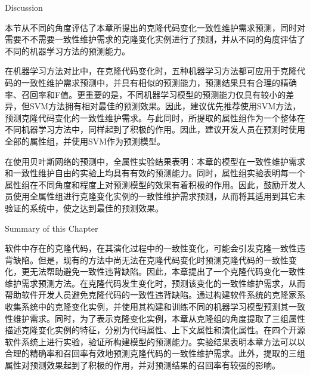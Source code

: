 
{Discussion}

本节从不同的角度评估了本章所提出的克隆代码变化一致性维护需求预测，同时对需要不不需要一致性维护需求的克隆变化实例进行了预测，并从不同的角度评估了不同的机器学习方法的预测能力。

在机器学习方法对比中，在克隆代码变化时，五种机器学习方法都可应用于克隆代码的一致性维护需求预测中，并具有相似的预测能力，预测结果具有合理的精确率、召回率和F值。更重要的是，不同机器学习模型的预测能力仅具有较小的差异，但SVM方法拥有相对最佳的预测效果。因此，建议优先推荐使用SVM方法，预测克隆代码变化的一致性维护需求。与此同时，所提取的属性组作为一个整体在不同机器学习方法中，同样起到了积极的作用。因此，建议开发人员在预测时使用全部的属性组，并使用SVM作为预测模型。

在使用贝叶斯网络的预测中，全属性实验结果表明：本章的模型在一致性维护需求和一致性维护自由的实验上均具有有效的预测能力。同时，属性组实验表明每一个属性组在不同角度和程度上对预测模型的效果有着积极的作用。因此，鼓励开发人员使用全属性组进行克隆变化实例的一致性维护需求预测，从而将其适用到其它未验证的系统中，使之达到最佳的预测效果。

{Summary of this Chapter}

软件中存在的克隆代码，在其演化过程中的一致性变化，可能会引发克隆一致性违背缺陷。但是，现有的方法中尚无法在克隆代码变化时预测克隆代码的一致性变化，更无法帮助避免一致性违背缺陷。因此，本章提出了一个克隆代码变化一致性维护需求预测方法。在克隆代码发生变化时，预测该变化的一致性维护需求，从而帮助软件开发人员避免克隆代码的一致性违背缺陷。通过构建软件系统的克隆家系收集系统中的克隆变化实例，并使用其构建和训练不同的机器学习模型预测其一致性维护需求。同时，为了表示克隆变化实例，本章从克隆组的角度提取了三组属性描述克隆变化实例的特征，分别为代码属性、上下文属性和演化属性。在四个开源软件系统上进行实验，验证所构建模型的预测能力。实验结果表明本章方法可以以合理的精确率和召回率有效地预测克隆代码的一致性维护需求。此外，提取的三组属性对预测效果起到了积极的作用，并对预测结果的召回率有较强的影响。

